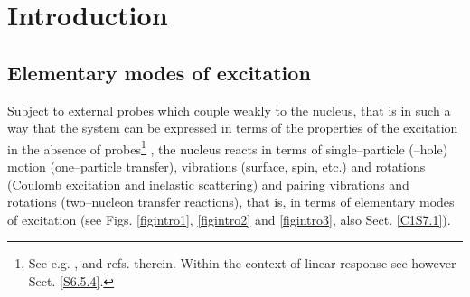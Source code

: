 \chapter{Introduction}\label{intro}













 \section{Elementary modes of excitation}\label{S1.1}
Subject to external probes which couple weakly to the nucleus, that is in such a way that the system can be expressed in terms of the properties of the excitation in the absence of probes\footnote{See e.g. \cite{Pines:66},\cite{Bohr:75} and refs. therein. Within the context of linear response see however Sect. \ref{S6.5.4}.} , the nucleus reacts  in terms  of single--particle (--hole) motion (one--particle transfer), vibrations (surface, spin, etc.) and rotations (Coulomb excitation and inelastic scattering) and pairing vibrations and rotations (two--nucleon transfer reactions), that is, in terms of elementary modes of excitation (see Figs. \ref{figintro1}, \ref{figintro2} and \ref{figintro3}, also Sect. \ref{C1S7.1}).

